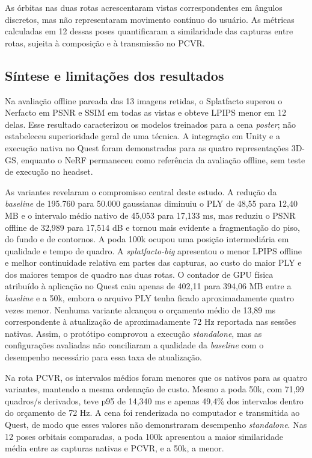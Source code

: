 As órbitas nas duas rotas acrescentaram vistas correspondentes em ângulos discretos, mas não representaram movimento contínuo do usuário. As métricas calculadas em 12 dessas poses quantificaram a similaridade das capturas entre rotas, sujeita à composição e à transmissão no PCVR.

\subsection{Síntese e limitações dos resultados}

Na avaliação offline pareada das 13 imagens retidas, o Splatfacto superou o Nerfacto em PSNR e SSIM em todas as vistas e obteve LPIPS menor em 12 delas. Esse resultado caracterizou os modelos treinados para a cena \textit{poster}; não estabeleceu superioridade geral de uma técnica. A integração em Unity e a execução nativa no Quest foram demonstradas para as quatro representações 3D-GS, enquanto o NeRF permaneceu como referência da avaliação offline, sem teste de execução no headset.

As variantes revelaram o compromisso central deste estudo. A redução da \textit{baseline} de 195.760 para 50.000 gaussianas diminuiu o PLY de 48,55 para 12,40 MB e o intervalo médio nativo de 45,053 para 17,133 ms, mas reduziu o PSNR offline de 32,989 para 17,514 dB e tornou mais evidente a fragmentação do piso, do fundo e de contornos. A poda 100k ocupou uma posição intermediária em qualidade e tempo de quadro. A \textit{splatfacto-big} apresentou o menor LPIPS offline e melhor continuidade relativa em partes das capturas, ao custo do maior PLY e dos maiores tempos de quadro nas duas rotas. O contador de GPU física atribuído à aplicação no Quest caiu apenas de 402,11 para 394,06 MB entre a \textit{baseline} e a 50k, embora o arquivo PLY tenha ficado aproximadamente quatro vezes menor. Nenhuma variante alcançou o orçamento médio de 13,89 ms correspondente à atualização de aproximadamente 72 Hz reportada nas sessões nativas. Assim, o protótipo comprovou a execução \textit{standalone}, mas as configurações avaliadas não conciliaram a qualidade da \textit{baseline} com o desempenho necessário para essa taxa de atualização.

Na rota PCVR, os intervalos médios foram menores que os nativos para as quatro variantes, mantendo a mesma ordenação de custo. Mesmo a poda 50k, com 71,99 quadros/s derivados, teve p95 de 14,340 ms e apenas 49,4\% dos intervalos dentro do orçamento de 72 Hz. A cena foi renderizada no computador e transmitida ao Quest, de modo que esses valores não demonstraram desempenho \textit{standalone}. Nas 12 poses orbitais comparadas, a poda 100k apresentou a maior similaridade média entre as capturas nativas e PCVR, e a 50k, a menor.

